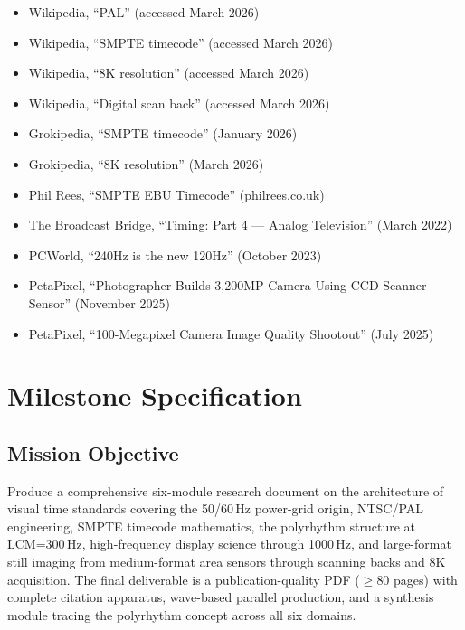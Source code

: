 \documentclass[11pt,letterpaper]{article}
\newcommand{\stageheader}[2]{%
  \noindent\colorbox{#2}{\makebox[\textwidth][l]{%
    \textcolor{white}{\bfseries\sffamily\hspace{6pt}#1\hspace{6pt}}}}%
  \vspace{0.5em}\par%
}
\begin{document}
\begin{itemize}[leftmargin=*]
  \item Wikipedia, ``PAL'' (accessed March 2026)
  \item Wikipedia, ``SMPTE timecode'' (accessed March 2026)
  \item Wikipedia, ``8K resolution'' (accessed March 2026)
  \item Wikipedia, ``Digital scan back'' (accessed March 2026)
  \item Grokipedia, ``SMPTE timecode'' (January 2026)
  \item Grokipedia, ``8K resolution'' (March 2026)
  \item Phil Rees, ``SMPTE EBU Timecode'' (philrees.co.uk)
  \item The Broadcast Bridge, ``Timing: Part 4 --- Analog Television'' (March 2022)
  \item PCWorld, ``240Hz is the new 120Hz'' (October 2023)
  \item PetaPixel, ``Photographer Builds 3,200MP Camera Using CCD Scanner Sensor'' (November 2025)
  \item PetaPixel, ``100-Megapixel Camera Image Quality Shootout'' (July 2025)
\end{itemize}

\newpage

\stageheader{STAGE 3 --- MISSION PACKAGE}{tertiary}

\section{Milestone Specification}

\subsection{Mission Objective}

Produce a comprehensive six-module research document on the architecture of visual time standards
covering the 50/60\,Hz power-grid origin, NTSC/PAL engineering, SMPTE timecode mathematics, the
polyrhythm structure at LCM=300\,Hz, high-frequency display science through 1000\,Hz, and large-format
still imaging from medium-format area sensors through scanning backs and 8K acquisition. The final
deliverable is a publication-quality PDF ($\geq$80 pages) with complete citation apparatus, wave-based
parallel production, and a synthesis module tracing the polyrhythm concept across all six domains.
\end{document}
